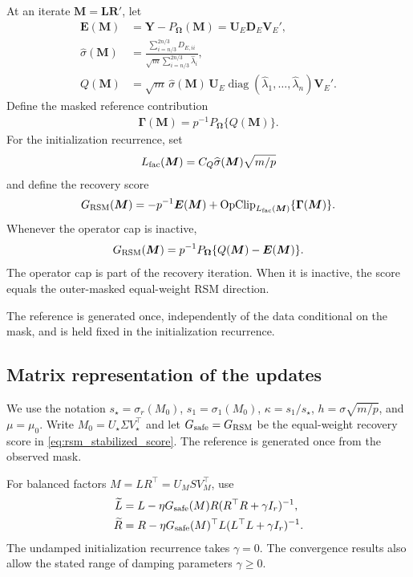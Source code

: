 \documentclass[numsec,webpdf,modern,large,namedate]{oup-authoring-template}
\theoremstyle{plain}
\theoremstyle{remark}
\newcommand{\M}{\bm{M}}
\newcommand{\Y}{\bm{Y}}
\newcommand{\bOmega}{\bm{\Omega}}
\newcommand{\U}{\bm{U}}
\newcommand{\V}{\bm{V}}
\newcommand{\bL}{\bm{L}}
\newcommand{\R}{\bm{R}}
\newif\ifmarkchanges
\newenvironment{revision}{\begingroup\ifmarkchanges\color{red}\fi}{\endgroup}
\begin{document}
\begin{revision}
At an iterate $\M=\bL\R'$, let
\begin{align*}
 \bm E(\M)
 &=
 \Y-P_{\bOmega}(\M)
 =
 \U_E\bm D_E\V_E',\\
 \widehat\sigma(\M)
 &=
 \frac{
 \sum_{i=n/3}^{2n/3}D_{E,ii}
 }{
 \sqrt m\sum_{i=n/3}^{2n/3}\widehat\lambda_i
 },\\
 Q(\M)
 &=
 \sqrt m\,\widehat\sigma(\M)\,
 \U_E
 \operatorname{diag}
 (\widehat\lambda_1,\ldots,\widehat\lambda_n)
 \V_E'.
\end{align*}
Define the masked reference contribution
\begin{align}
\label{eq:rsm_masked_reference}
 \bm\Gamma(\M)=p^{-1}P_{\bOmega}\{Q(\M)\}.
\end{align}
For the initialization recurrence, set
\begin{align}
\label{eq:rsm_factor_reference_cap}
 L_{\rm fac}(\M)
 =C_Q\widehat\sigma(\M)\sqrt{m/p}
\end{align}
and define the recovery score
\begin{align}
\label{eq:rsm_stabilized_score}
 G_{\rm RSM}(\M)
 =
 -p^{-1}\bm E(\M)
 +\operatorname{OpClip}_{L_{\rm fac}(\M)}
 \{\bm\Gamma(\M)\}.
\end{align}
Whenever the operator cap is inactive,
\begin{align}
\label{eq:rsm_literal_when_inactive}
 G_{\rm RSM}(\M)
 =p^{-1}P_{\bOmega}
 \{Q(\M)-\bm E(\M)\}.
\end{align}
The operator cap is part of the recovery iteration.  When it is inactive,
the score equals the outer-masked equal-weight RSM direction.

The reference is generated once, independently of the data conditional
on the mask, and is held fixed in the initialization recurrence.

\subsection{Matrix representation of the updates}
\label{sec:recovery_theory}
We use the notation $s_\star=\sigma_r(M_0)$, $s_1=\sigma_1(M_0)$,
$\kappa=s_1/s_\star$, $h=\sigma\sqrt{m/p}$, and $\mu=\mu_0$.
Write $M_0=U_\star\Sigma V_\star^\top$ and let
$G_{\rm safe}=G_{\rm RSM}$ be the equal-weight recovery score
in \eqref{eq:rsm_stabilized_score}.  The reference is generated once
from the observed mask.

For balanced factors $M=LR^\top=U_M S V_M^\top$, use
\begin{align}
 \widetilde L&=L-\eta G_{\rm safe}(M)R(R^\top R+\gamma I_r)^{-1},\label{eq:recovery_updateL}\\
 \widetilde R&=R-\eta G_{\rm safe}(M)^\top L(L^\top L+\gamma I_r)^{-1}.
 \label{eq:recovery_updateR}
\end{align}
The undamped initialization recurrence takes $\gamma=0$.
The convergence results also allow the stated range of damping parameters
$\gamma\ge0$.


\end{revision}
\end{document}
